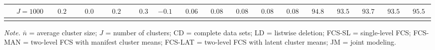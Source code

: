 \begin{sidewaystable}
\begin{threeparttable}
\begin{tabular}{llccccccccccccccc}
 & \nopagebreak $\;J=1000$  & $\phantom{-}0.2\phantom{0}$ & $\phantom{-}0.0\phantom{0}$ & $\phantom{-}0.2\phantom{0}$ & $\phantom{-}0.3\phantom{0}$ & ${-}0.1\phantom{0}$ & $\phantom{0}0.06\phantom{0}$ & $\phantom{0}0.08\phantom{0}$ & $\phantom{0}0.08\phantom{0}$ & $\phantom{0}0.08\phantom{0}$ & $\phantom{0}0.08\phantom{0}$ & $\phantom{0}94.8\phantom{0}$ & $\phantom{0}93.5\phantom{0}$ & $\phantom{0}93.7\phantom{0}$ & $\phantom{0}93.5\phantom{0}$ & $\phantom{0}95.5\phantom{0}$ \\
[0.5ex]\hline\\[-1.6ex] 
\end{tabular}
\begin{tablenotes}{\footnotesize \textit{Note.} $\bar{n}$ = average cluster size; $J$ = number of clusters; CD = complete data sets; LD = listwise deletion; FCS-SL = single-level FCS; FCS-MAN = two-level FCS with manifest cluster means; FCS-LAT = two-level FCS with latent cluster means; JM = joint modeling.}\end{tablenotes}
\end{threeparttable}
\end{sidewaystable}
